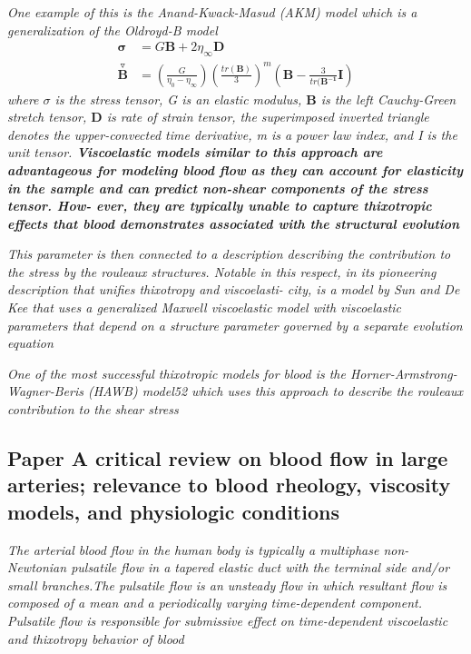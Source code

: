 \documentclass[11pt,letterpaper]{article}
\begin{document}
\textit{One example of this is the Anand-Kwack-Masud (AKM) model which is a generalization of the Oldroyd-B model
\begin{align}
    \bm{\sigma} &= G \bm{B} + 2\eta_{\infty} \bm{D} \\
   \overset{\triangledown}{\bm{B}} &= (\frac{G}{\eta_0-\eta_{\infty}})(\frac{tr(\bm{B})}{3})^m(\bm{B}-\frac{3}{tr(\bm{B^{-1}}}\bm{I})
\end{align}
where $\sigma$ is the stress tensor, G is an elastic modulus, $\bm{B}$ is the left Cauchy-Green stretch tensor, $\bm{D}$  is rate of strain tensor, the superimposed inverted triangle denotes the upper-convected time derivative, m is a power law index, and I is the unit tensor. \textbf{Viscoelastic models similar to this approach are advantageous for modeling blood flow as they can account for elasticity in the sample and can predict non-shear components of the stress tensor. How- ever, they are typically unable to capture thixotropic effects that blood demonstrates associated with the structural evolution}
}

\textit{This parameter is then connected to a description describing the contribution to the stress by the rouleaux structures. Notable in this respect, in its pioneering description that unifies thixotropy and viscoelasti- city, is a model by Sun and De Kee that uses a generalized Maxwell viscoelastic model with viscoelastic parameters that depend on a structure parameter governed by a separate evolution equation}

\textit{One of the most successful thixotropic models for blood is
the Horner-Armstrong-Wagner-Beris (HAWB) model52 which uses this approach to describe the rouleaux contribution to the shear stress }


\newpage
\subsection{Paper A critical review on blood  flow in large  arteries; relevance to blood rheology, viscosity models,  and physiologic  conditions}


\textit{The  arterial blood flow in  the human body is typically  a
multiphase non-Newtonian pulsatile flow in a  tapered elastic duct with the terminal side and/or small  branches.The pulsatile flow is an unsteady  flow  in which resultant flow is  composed  of  a mean and  a periodically varying time-dependent component. Pulsatile flow  is responsible  for submissive effect  on  time-dependent viscoelastic and thixotropy behavior of  blood}
\end{document}
